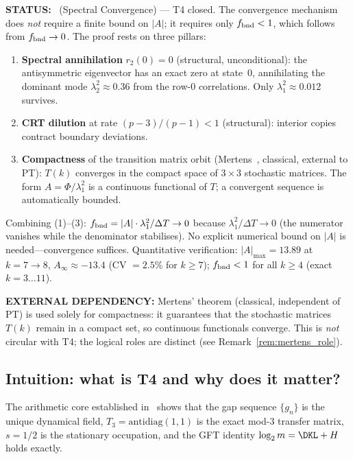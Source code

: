 \documentclass[12pt,a4paper]{article}
\begin{document}
\begin{statusbox}
\textbf{STATUS:}
  \THMTAG~(Spectral Convergence) ---
  T4 closed.
  The convergence mechanism does \emph{not} require a finite bound
  on $|A|$; it requires only $f_{\rm bnd} < 1$, which follows from
  $f_{\rm bnd} \to 0$.  The proof rests on three pillars:
  \begin{enumerate}[nosep]
  \item \textbf{Spectral annihilation} $r_2(0) = 0$
    (structural, unconditional): the antisymmetric eigenvector has
    an exact zero at state~0, annihilating the dominant mode
    $\lambda_2^2 \approx 0.36$ from the row-0 correlations.
    Only $\lambda_1^2 \approx 0.012$ survives.
  \item \textbf{CRT dilution} at rate $(p{-}3)/(p{-}1) < 1$
    (structural): interior copies contract boundary deviations.
  \item \textbf{Compactness} of the transition matrix orbit
    (Mertens~\cite{Mertens1874}, classical, external to PT): $T(k)$ converges in
    the compact space of $3\times 3$ stochastic matrices.
    The form $A = \Phi/\lambda_1^2$ is a continuous functional
    of $T$; a convergent sequence is automatically bounded.
  \end{enumerate}
  Combining (1)--(3): $f_{\rm bnd} = |A| \cdot \lambda_1^2/\Delta T
  \to 0$ because $\lambda_1^2/\Delta T \to 0$ (the numerator vanishes
  while the denominator stabilises). No explicit numerical bound on
  $|A|$ is needed---convergence suffices.
  Quantitative verification: $|A|_{\max} = 13.89$ at $k = 7\to 8$,
  $A_\infty \approx -13.4$ (CV $= 2.5\%$ for $k \geq 7$);
  $f_{\rm bnd} < 1$ for all $k \geq 4$ (exact $k = 3\ldots 11$).

\textbf{EXTERNAL DEPENDENCY:}
  Mertens' theorem (classical, independent of PT) is used solely
  for compactness: it guarantees that the stochastic matrices
  $T(k)$ remain in a compact set, so continuous functionals
  converge.  This is \emph{not} circular with T4; the logical
  roles are distinct (see Remark~\ref{rem:mertens_role}).
\end{statusbox}

\subsection{Intuition: what is T4 and why does it matter?}
\label{sec:ch7_intuition}

The arithmetic core established in~\cite{companion_M1,companion_M2}
shows that the gap sequence
$\{g_n\}$ is the unique dynamical field, $T_3 = \mathrm{antidiag}(1,1)$
is the exact mod-3 transfer matrix, $s = 1/2$ is the stationary
occupation, and the GFT identity $\log_2 m = \DKL + H$ holds exactly.
\end{document}

